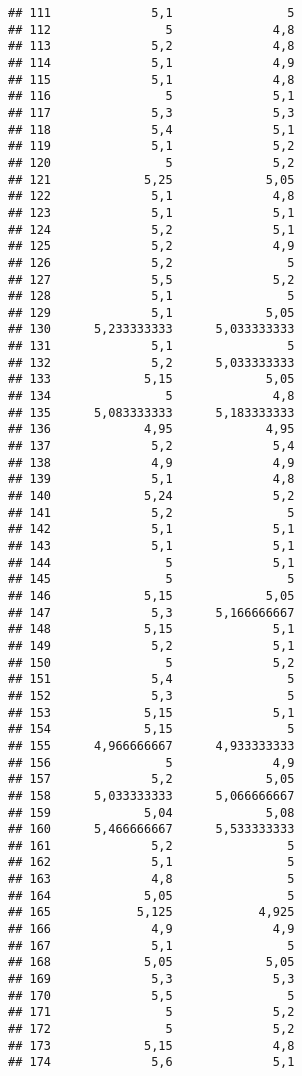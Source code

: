\documentclass[
]{article}
\begin{document}
\begin{verbatim}
## 111              5,1                5
## 112                5              4,8
## 113              5,2              4,8
## 114              5,1              4,9
## 115              5,1              4,8
## 116                5              5,1
## 117              5,3              5,3
## 118              5,4              5,1
## 119              5,1              5,2
## 120                5              5,2
## 121             5,25             5,05
## 122              5,1              4,8
## 123              5,1              5,1
## 124              5,2              5,1
## 125              5,2              4,9
## 126              5,2                5
## 127              5,5              5,2
## 128              5,1                5
## 129              5,1             5,05
## 130      5,233333333      5,033333333
## 131              5,1                5
## 132              5,2      5,033333333
## 133             5,15             5,05
## 134                5              4,8
## 135      5,083333333      5,183333333
## 136             4,95             4,95
## 137              5,2              5,4
## 138              4,9              4,9
## 139              5,1              4,8
## 140             5,24              5,2
## 141              5,2                5
## 142              5,1              5,1
## 143              5,1              5,1
## 144                5              5,1
## 145                5                5
## 146             5,15             5,05
## 147              5,3      5,166666667
## 148             5,15              5,1
## 149              5,2              5,1
## 150                5              5,2
## 151              5,4                5
## 152              5,3                5
## 153             5,15              5,1
## 154             5,15                5
## 155      4,966666667      4,933333333
## 156                5              4,9
## 157              5,2             5,05
## 158      5,033333333      5,066666667
## 159             5,04             5,08
## 160      5,466666667      5,533333333
## 161              5,2                5
## 162              5,1                5
## 163              4,8                5
## 164             5,05                5
## 165            5,125            4,925
## 166              4,9              4,9
## 167              5,1                5
## 168             5,05             5,05
## 169              5,3              5,3
## 170              5,5                5
## 171                5              5,2
## 172                5              5,2
## 173             5,15              4,8
## 174              5,6              5,1

\end{verbatim}
\end{document}

